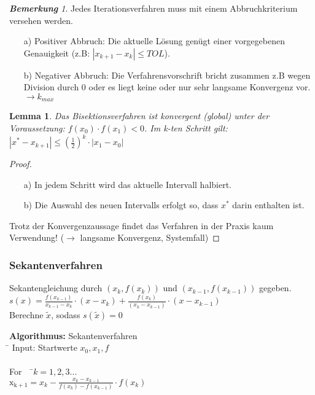 \documentclass[10pt,a4paper]{article}
\newtheorem{lemma}{Lemma}[section]
\theoremstyle{definition} \newtheorem{definition}{Definition}[section]
\theoremstyle{remark}     \newtheorem*{bemerkung}{\textbf{Bemerkung}} %
\begin{document}
\begin{bemerkung}
Jedes Iterationsverfahren muss mit einem Abbruchkriterium versehen werden.
\end{bemerkung}


\begin{enumerate}
\item[a)] Positiver Abbruch: Die aktuelle Lösung genügt einer vorgegebenen Genauigkeit
      (z.B: $|x_{k+1}-x_k|\leq TOL$).
\item[b)] Negativer Abbruch: Die Verfahrensvorschrift bricht zusammen z.B wegen Division durch 0
      oder es liegt keine oder nur sehr langsame Konvergenz vor. $\rightarrow k_{max}$
\end{enumerate}

\begin{lemma}
Das Bisektionsverfahren ist konvergent (global) unter der Voraussetzung:
$f(x_0) \cdot f(x_1) <0$. Im k-ten Schritt gilt: $|x^*-x_{k+1}|\leq
(\frac{1}{2})^k \cdot |x_1-x_0|$ 
\end{lemma}

\begin{proof}
~
\begin{enumerate}
\item[a)] In jedem Schritt wird das aktuelle Intervall halbiert. 
\item[b)] Die Auswahl des neuen Intervalls erfolgt so, dass $x^*$ darin enthalten ist.
\end{enumerate}
Trotz der Konvergenzaussage findet das Verfahren in der Praxis kaum Verwendung! ($\rightarrow$ langsame Konvergenz, Systemfall)
\end{proof}

\subsubsection{Sekantenverfahren}

Sekantengleichung durch $(x_k, f(x_k))$ und $(x_{k-1}, f(x_{k-1}))$ gegeben.
\newline
\\$s(x)=\frac{f(x_{k-1})}{x_{k-1}-x_k} \cdot (x-x_k)+\frac{f(x_k)}{(x_k-x_{k-1})}\cdot (x-x_{k-1})$
\newline
\\Berechne $\tilde x$, sodass $s(\tilde x)=0$
\begin{tabbing}

\textbf{Algorithmus:} Sekantenverfahren\\
\= \kill
Input: Startwerte $x_0, x_1, f$\\
\newline
\\\> For \ \ \=$k=1,2,3...$\\ 
\> \> $\mathrm{x_{k+1}}= x_k - \frac{x_k-x_{k-1}}{f(x_k)-f(x_{k-1})} \cdot f(x_k)$ \\
\end{tabbing}
\end{document}
